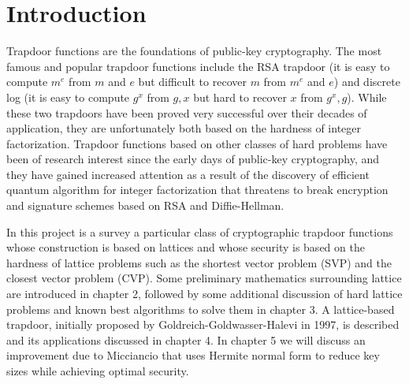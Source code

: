 \section{Introduction}

Trapdoor functions are the foundations of public-key cryptography. The most famous and popular trapdoor functions include the RSA trapdoor (it is easy to compute $m^e$ from $m$ and $e$ but difficult to recover $m$ from $m^e$ and $e$) and discrete log (it is easy to compute $g^x$ from $g, x$ but hard to recover $x$ from $g^x, g$). While these two trapdoors have been proved very successful over their decades of application, they are unfortunately both based on the hardness of integer factorization. Trapdoor functions based on other classes of hard problems have been of research interest since the early days of public-key cryptography, and they have gained increased attention as a result of the discovery of efficient quantum algorithm for integer factorization that threatens to break encryption and signature schemes based on RSA and Diffie-Hellman.

In this project is a survey a particular class of cryptographic trapdoor functions whose construction is based on lattices and whose security is based on the hardness of lattice problems such as the shortest vector problem (SVP) and the closest vector problem (CVP). Some preliminary mathematics surrounding lattice are introduced in chapter 2, followed by some additional discussion of hard lattice problems and known best algorithms to solve them in chapter 3. A lattice-based trapdoor, initially proposed by Goldreich-Goldwasser-Halevi in 1997, is described and its applications discussed in chapter 4. In chapter 5 we will discuss an improvement due to Micciancio that uses Hermite normal form to reduce key sizes while achieving optimal security.